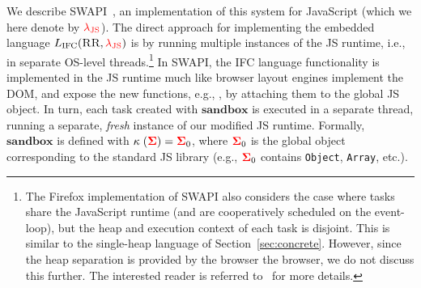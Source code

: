 \documentclass{sigplanconf}
\newcommand{\Red}[1]{{\color{red} #1}}
\begin{document}
We describe SWAPI~\cite{swapi}, an implementation of this system for JavaScript
(which we here denote by \ensuremath{\Red{\lambda_{\text{JS}}}}).
%
The direct approach for implementing the embedded language \ensuremath{L_\text{IFC}(\textsc{RR},\Red{\lambda_{\text{JS}}})} is
by running multiple instances of the JS runtime, i.e., in
separate OS-level threads.\footnote{
 The Firefox implementation of SWAPI also considers the case where
 tasks share the JavaScript runtime (and are cooperatively scheduled
 on the event-loop), but the heap and execution context of each task
 is disjoint. This is similar to the single-heap language of
 Section~\ref{sec:concrete}.  However, since the heap separation is
 provided by the browser the browser, we do not discuss this further.
 The interested reader is referred to~\cite{swapi} for more details.
}
%
In SWAPI, the IFC language functionality is implemented in the JS
runtime much like browser layout engines implement the DOM, and expose
the new functions, e.g., , by attaching them to
the global JS object.
%
In turn, each task created with \ensuremath{\mathbf{sandbox}} is
executed in a separate thread, running a separate, \emph{fresh} instance of our
modified JS runtime.
%
Formally, \ensuremath{\mathbf{sandbox}} is defined with \ensuremath{\kappa\;(\tar{\Sigma})\mathrel{=}\tar{\Sigma}_{0}}, where \ensuremath{\tar{\Sigma}_{0}} is the global object corresponding to the standard
JS library (e.g., \ensuremath{\tar{\Sigma}_{0}} contains \texttt{Object}, \texttt{Array},
etc.).
\end{document}
